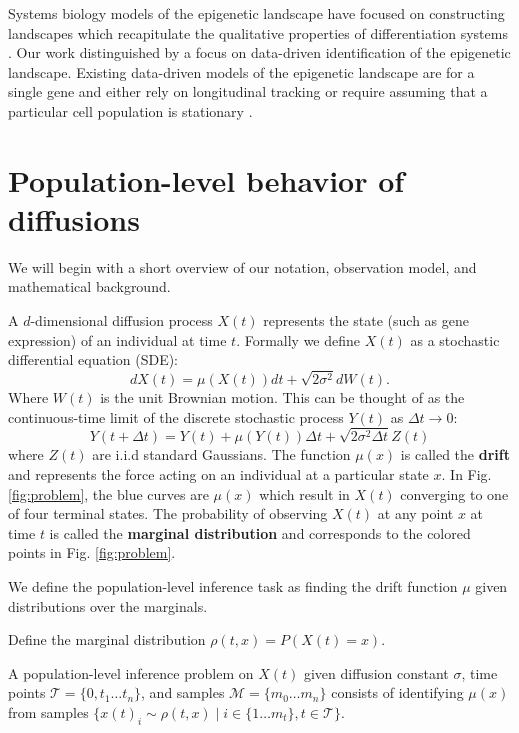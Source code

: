 \documentclass{article}
\begin{document}
Systems biology models of the epigenetic landscape have focused on constructing landscapes which recapitulate the qualitative properties of differentiation systems \citep{qiu2012understanding,bhattacharya2011deterministic}. Our work distinguished by a focus on data-driven identification of the epigenetic landscape. Existing data-driven models of the epigenetic landscape are for a single gene and either rely on longitudinal tracking \citep{sisan2012predicting} or require assuming that a particular cell population is stationary \citep{luo2013cell}.

\section{Population-level behavior of diffusions}
We will begin with a short overview of our notation, observation model, and mathematical background.

A $d$-dimensional diffusion process $X(t)$ represents the state (such as gene expression) of an individual at time $t$. Formally we define $X(t)$ as a stochastic differential equation (SDE):
\begin{equation}\label{eq:sde}
dX(t) = \mu(X(t))dt + \sqrt{2\sigma^2} dW(t).
\end{equation}
Where $W(t)$ is the unit Brownian motion. This can be thought of as the continuous-time limit of the discrete stochastic process $Y(t)$ as $\Delta t\to 0$:
\begin{equation}\label{eq:discr}
Y(t+\Delta t) = Y(t)+\mu(Y(t))\Delta t + \sqrt{2\sigma^2\Delta t} Z(t)
\end{equation}
where $Z(t)$ are i.i.d standard Gaussians. The function $\mu(x)$ is called the \textbf{drift} and represents the force acting on an individual at a particular state $x$. In Fig. \ref{fig:problem}, the blue curves are $\mu(x)$ which result in $X(t)$ converging to one of four terminal states. The probability of observing $X(t)$ at any point $x$ at time $t$ is called the \textbf{marginal distribution} and corresponds to the colored points in Fig. \ref{fig:problem}.

We define the population-level inference task as finding the drift function $\mu$ given distributions over the marginals.
\begin{defn}

Define the marginal distribution $\rho(t,x) = P(X(t)=x)$.

A population-level inference problem on $X(t)$ given diffusion constant $\sigma$, time points $\mathcal{T}=\{0, t_1 \hdots t_n\}$, and samples $\mathcal{M}=\{m_0 \hdots m_n\}$ consists of identifying $\mu(x)$ from samples
$\{x(t)_i \sim \rho(t,x) \mid i \in \{1\hdots m_t\}, t\in \mathcal{T}\}$.

\end{defn}
\end{document}
